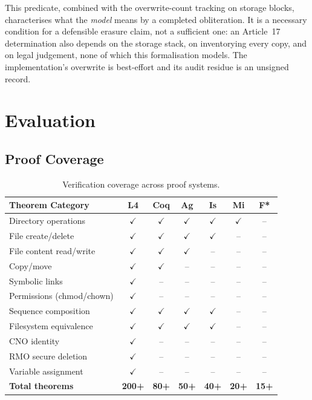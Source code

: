 \documentclass[11pt,a4paper]{article}
\begin{document}
This predicate, combined with the overwrite-count tracking on storage blocks,
characterises what the \emph{model} means by a completed obliteration. It is a
necessary condition for a defensible erasure claim, not a sufficient one: an
Article~17 determination also depends on the storage stack, on inventorying
every copy, and on legal judgement, none of which this formalisation models.
The implementation's overwrite is best-effort and its audit residue is an
unsigned record.

\section{Evaluation}
\label{sec:evaluation}

\subsection{Proof Coverage}

\begin{table}[t]
\centering
\caption{Verification coverage across proof systems.}
\label{tab:coverage}
\begin{tabular}{@{}lcccccc@{}}
\toprule
\textbf{Theorem Category} & \textbf{L4} & \textbf{Coq} & \textbf{Ag} &
\textbf{Is} & \textbf{Mi} & \textbf{F*} \\
\midrule
Directory operations       & $\checkmark$ & $\checkmark$ & $\checkmark$ & $\checkmark$ & $\checkmark$ & -- \\
File create/delete         & $\checkmark$ & $\checkmark$ & $\checkmark$ & $\checkmark$ & -- & -- \\
File content read/write    & $\checkmark$ & $\checkmark$ & $\checkmark$ & -- & -- & -- \\
Copy/move                  & $\checkmark$ & $\checkmark$ & -- & -- & -- & -- \\
Symbolic links             & $\checkmark$ & -- & -- & -- & -- & -- \\
Permissions (chmod/chown)  & $\checkmark$ & -- & -- & -- & -- & -- \\
Sequence composition       & $\checkmark$ & $\checkmark$ & $\checkmark$ & $\checkmark$ & -- & -- \\
Filesystem equivalence     & $\checkmark$ & $\checkmark$ & $\checkmark$ & $\checkmark$ & -- & -- \\
CNO identity               & $\checkmark$ & -- & -- & -- & -- & -- \\
RMO secure deletion        & $\checkmark$ & -- & -- & -- & -- & -- \\
Variable assignment        & $\checkmark$ & -- & -- & -- & -- & -- \\
\midrule
\textbf{Total theorems}    & \textbf{200+} & \textbf{80+} & \textbf{50+} & \textbf{40+} & \textbf{20+} & \textbf{15+} \\
\bottomrule
\end{tabular}
\end{table}
\end{document}

